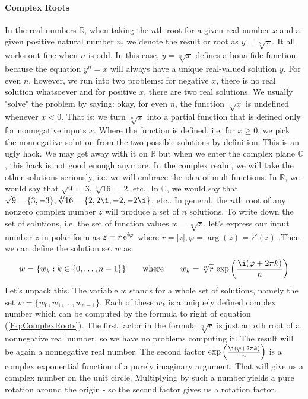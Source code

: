 \paragraph{Complex Roots}
In the real numbers $\mathbb{R}$, when taking the $n$th root for a given real number $x$ and a given positive natural number $n$, we denote the result or root as $y = \sqrt[n]{x}$. It all works out fine when $n$ is odd. In this case, $y = \sqrt[n]{x}$ defines a bona-fide function because the equation $y^n = x$ will always have a unique real-valued solution $y$. For even $n$, however, we run into two problems: for negative $x$, there is no real solution whatsoever and for positive $x$, there are two real solutions. We usually "solve" the problem by saying: okay, for even $n$, the function $\sqrt[n]{x}$ is undefined whenever $x < 0$. That is: we turn $\sqrt[n]{x}$ into a partial function that is defined only for nonnegative inputs $x$. Where the function is defined, i.e. for $x \geq 0$, we pick the nonnegative solution from the two possible solutions by definition. This is an ugly hack. We may get away with it on $\mathbb{R}$ but when we enter the complex plane $\mathbb{C}$, this hack is not good enough anymore. In the complex realm, we will take the other solutions seriously, i.e. we will embrace the idea of multifunctions. In $\mathbb{R}$, we would say that $\sqrt{9} = 3, \sqrt[4]{16} = 2$, etc.. In $\mathbb{C}$, we would say that $\sqrt{9} = \{3, -3\}, \sqrt[4]{16} = \{2,2\i,-2,-2\i\}$, etc.. In general, the $n$th root of any nonzero complex number $z$ will produce a set of $n$ solutions. To write down the set of solutions, i.e. the set of function values $w = \sqrt[n]{z}$, let's express our input number $z$ in polar form as $z = r \operatorname{\mathrm{e}}^{i \varphi}$ where $r = |z|, \varphi = \arg(z) = \angle(z)$. Then we can define the solution set $w$ as:
\begin{equation}
 \label{Eq:ComplexRoots}
 w = \{ w_k : k \in \{0,\ldots,n-1\} \}
 \qquad \text{where} \qquad
 w_k = \sqrt[n]{r} \, \exp \left( \frac{\i (\varphi + 2 \pi k) }{n} \right)
\end{equation}
Let's unpack this. The variable $w$ stands for a whole set of solutions, namely the set $w = \{w_0, w_1, \ldots, w_{n-1}\}$. Each of these $w_k$ is a uniquely defined complex number which can be computed by the formula to right of equation (\ref{Eq:ComplexRoots}). The first factor in the formula $\sqrt[n]{r}$ is just an $n$th root of a nonnegative real number, so we have no problems computing it. The result will be again a nonnegative real number. The second factor $\exp \left( \frac{\i (\varphi + 2 \pi k) }{n} \right)$ is a complex exponential function of a purely imaginary argument. That will give us a complex number on the unit circle. Multiplying by such a number yields a pure rotation around the origin - so the second factor gives us a rotation factor. 

